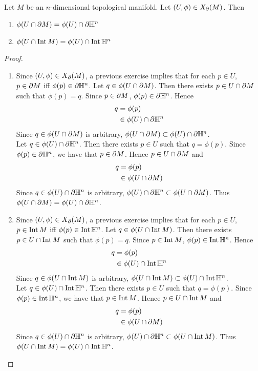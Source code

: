 \documentclass{book}
\begin{document}
	\begin{ex}
		Let $M$ be an $n$-dimensional topological manifold. Let $(U, \phi) \in X_{\partial}(M)$. Then 
		\begin{enumerate}
			\item $\phi(U \cap \partial M) = \phi(U) \cap \partial \mathbb{H}^n$ 
			\item $\phi(U \cap \operatorname{Int} M) = \phi(U) \cap \operatorname{Int} \mathbb{H}^n$ 
		\end{enumerate}
	\end{ex}

	\begin{proof} \
		\begin{enumerate}
			\item Since $(U, \phi) \in X_{\partial}(M)$, a previous exercise implies that for each $p \in U$, $p \in \partial M$ iff $\phi(p) \in \partial \mathbb{H}^n$. Let $q \in \phi(U \cap \partial M)$. Then there exists $p \in U \cap \partial M$ such that $\phi(p) = q$. Since $p \in \partial M$, $\phi(p) \in \partial \mathbb{H}^n$. Hence 
			\begin{align*}
				q 
				& = \phi(p) \\
				& \in \phi(U) \cap \partial \mathbb{H}^n
			\end{align*}
			Since $q \in \phi(U \cap \partial M)$ is arbitrary, $\phi(U \cap \partial M) \subset \phi(U) \cap \partial \mathbb{H}^n$. \\
			Let $q \in \phi(U) \cap \partial \mathbb{H}^n$. Then there exists $p \in U$ such that $q = \phi(p)$. Since $\phi(p) \in \partial \mathbb{H}^n$, we have that $p \in \partial M$. Hence $p \in U \cap \partial M$ and 
			\begin{align*}
				q 
				& = \phi(p) \\
				& \in \phi(U \cap \partial M)
			\end{align*}
			Since $q \in \phi(U) \cap \partial \mathbb{H}^n$ is arbitrary, $\phi(U) \cap \partial \mathbb{H}^n \subset \phi(U \cap \partial M)$. Thus $\phi(U \cap \partial M) = \phi(U) \cap \partial \mathbb{H}^n$.
			\item Since $(U, \phi) \in X_{\partial}(M)$, a previous exercise implies that for each $p \in U$, $p \in \operatorname{Int} M$ iff $\phi(p) \in \operatorname{Int} \mathbb{H}^n$.  Let $q \in \phi(U \cap \operatorname{Int} M)$. Then there exists $p \in U \cap \operatorname{Int} M$ such that $\phi(p) = q$. Since $p \in \operatorname{Int} M$, $\phi(p) \in \operatorname{Int} \mathbb{H}^n$. Hence 
			\begin{align*}
				q 
				& = \phi(p) \\
				& \in \phi(U) \cap \operatorname{Int} \mathbb{H}^n
			\end{align*}
			Since $q \in \phi(U \cap \operatorname{Int} M)$ is arbitrary, $\phi(U \cap \operatorname{Int} M) \subset \phi(U) \cap \operatorname{Int} \mathbb{H}^n$. \\
			Let $q \in \phi(U) \cap \operatorname{Int} \mathbb{H}^n$. Then there exists $p \in U$ such that $q = \phi(p)$. Since $\phi(p) \in \operatorname{Int} \mathbb{H}^n$, we have that $p \in \operatorname{Int} M$. Hence $p \in U \cap \operatorname{Int} M$ and 
			\begin{align*}
				q 
				& = \phi(p) \\
				& \in \phi(U \cap \partial M)
			\end{align*}
			Since $q \in \phi(U) \cap \partial \mathbb{H}^n$ is arbitrary, $\phi(U) \cap \partial \mathbb{H}^n \subset \phi(U \cap \operatorname{Int} M)$. Thus $\phi(U \cap \operatorname{Int} M) = \phi(U) \cap \operatorname{Int} \mathbb{H}^n$.
		\end{enumerate}
	\end{proof}
\end{document}
